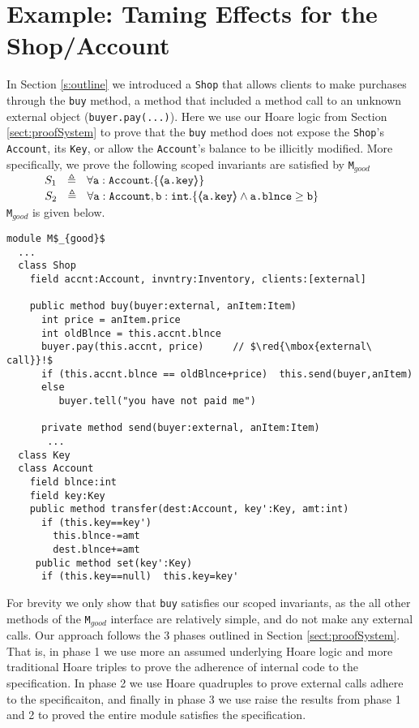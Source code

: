 \section{Example: Taming Effects for the Shop/Account}
In Section \ref{s:outline} we introduced a \verb|Shop| that allows clients to make purchases through the
\verb|buy| method, a method that included a method call to an unknown external object (\verb|buyer.pay(...)|).
Here we use our Hoare logic from Section \ref{sect:proofSystem} to prove that the \verb|buy| method
does not expose the \verb|Shop|'s  \verb|Account|, its \verb|Key|, or allow the \verb|Account|'s balance to be illicitly modified. 
More specifically, we prove the following scoped invariants are satisfied by \verb|M|$_{good}$\\
$\strut  \SPSP  S_1\ \  \triangleq \ \ \TwoStatesN  {\prg{a}:\prg{Account}}  {\inside{\prg{a.key}}} $ 
 \\
$\strut  \SPSP  S_2\ \  \triangleq \ \ \TwoStatesN{ \prg{a}:\prg{Account},\prg{b}:\prg{int} } {\inside{\prg{a.key}} \wedge \prg{a.\balance} \geq \prg{b} } $\\
\verb|M|$_{good}$ is given below.
\begin{lstlisting}[mathescape=true, language=Chainmail, frame=lines]
module M$_{good}$
  ...   
  class Shop
    field accnt:Account, invntry:Inventory, clients:[external]    
  
    public method buy(buyer:external, anItem:Item)
      int price = anItem.price
      int oldBlnce = this.accnt.blnce
      buyer.pay(this.accnt, price)     // $\red{\mbox{external\ call}}!$
      if (this.accnt.blnce == oldBlnce+price)  this.send(buyer,anItem)
      else
         buyer.tell("you have not paid me") 
     
      private method send(buyer:external, anItem:Item)  
       ... 
  class Key
  class Account
    field blnce:int 
    field key:Key
    public method transfer(dest:Account, key':Key, amt:int)
      if (this.key==key')
        this.blnce-=amt
        dest.blnce+=amt
     public method set(key':Key)
      if (this.key==null)  this.key=key'
\end{lstlisting}

For brevity we only show that \verb|buy| satisfies our scoped invariants, as the all other methods of 
the \verb|M|$_{good}$ interface are relatively simple, and do not make any external calls. 
Our approach follows the 3 phases outlined in Section \ref{sect:proofSystem}. That is, in
phase 1 we use more an assumed underlying Hoare logic and more traditional Hoare triples to prove the adherence of internal code to
the specification. In phase 2 we use Hoare quadruples to prove external calls adhere
to the specificaiton, and finally in phase 3 we use raise the results from phase 1 and 2 to proved
the entire module satisfies the specification.

